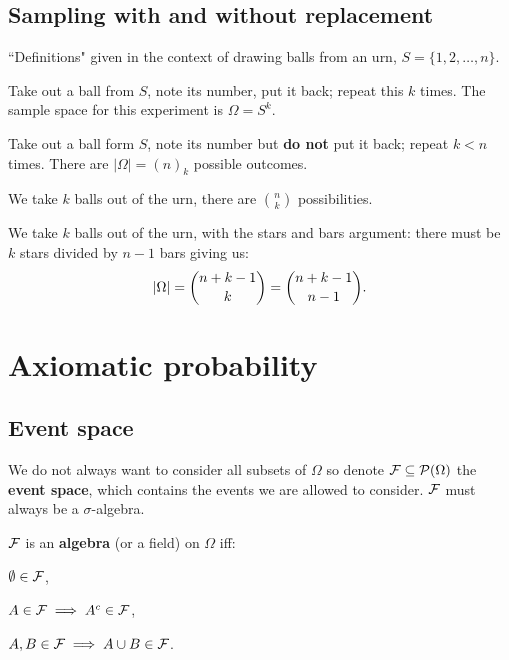 \documentclass[../Year1/Year1.tex]{subfiles}
\begin{document}
\subsection{Sampling with and without replacement}
``Definitions" given in the context of drawing balls from an urn, $S=\{1,2,\ldots,n\}$.
\begin{definition}
    Take out a ball from $S$, note its number, put it back; repeat this $k$ times. The sample space for this experiment is $\Omega = S^k$.
\end{definition}

\begin{definition}
    Take out a ball form $S$, note its number but \textbf{do not} put it back; repeat $k<n$ times. There are $|\Omega| = (n)_k$ possible outcomes.
\end{definition}


\begin{definition}
    We take $k$ balls out of the urn, there are $\binom{n}{k}$ possibilities.
\end{definition}

\begingroup\belowdisplayskip=-10pt
    \begin{definition}
        We take $k$ balls out of the urn, with the stars and bars argument: there must be $k$ stars divided by $n-1$ bars giving us:
        \[
        |\Omega| = \binom{n+k-1}{k} = \binom{n+k-1}{n-1}\textcolor{black}{.}
        \]
    \end{definition}
\endgroup


\section{Axiomatic probability}
\subsection{Event space}
We do not always want to consider all subsets of $\Omega$ so denote $\mathcal{F} \subseteq \mathcal{P}(\Omega)$ the \textbf{event space}, which contains the events we are allowed to consider. $\mathcal{F}$ must always be a $\sigma$-algebra.

\begin{definition}[Algebra]
    $\mathcal{F}$ is an \textbf{algebra} (or a field) on $\Omega$ iff:\\
    \begin{enumerate*}
        \item $\emptyset \in \mathcal{F}$, \hspace{100pt}
        \item $A \in \mathcal{F} \implies A^c \in \mathcal{F}$, \hspace{100pt}
        \item $A,B \in \mathcal{F} \implies A\cup B \in \mathcal{F}$.
    \end{enumerate*}
\end{definition}
\end{document}
